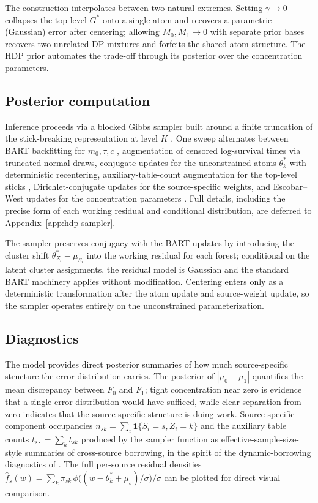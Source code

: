 \documentclass[11pt]{article}
\theoremstyle{plain}
\theoremstyle{definition}
\theoremstyle{remark}
\newcommand{\1}{\mathds{1}}
\begin{document}
The construction interpolates between two natural extremes. Setting $\gamma \to 0$ collapses the top-level $G^*$ onto a single atom and recovers a parametric (Gaussian) error after centering; allowing $M_0, M_1 \to 0$ with separate prior bases recovers two unrelated DP mixtures and forfeits the shared-atom structure. The HDP prior automates the trade-off through its posterior over the concentration parameters.

\subsection{Posterior computation}
\label{sec:hdp-computation}

Inference proceeds via a blocked Gibbs sampler built around a finite truncation of the stick-breaking representation at level $K$ \citep{ishwaran2001gibbs}. One sweep alternates between BART backfitting for $m_0, \tau, c$ \citep{chipman2010bart}, augmentation of censored log-survival times via truncated normal draws, conjugate updates for the unconstrained atoms $\theta_k^*$ with deterministic recentering, auxiliary-table-count augmentation for the top-level sticks \citep{teh2006hierarchical, antoniak1974mixtures}, Dirichlet-conjugate updates for the source-specific weights, and Escobar--West updates for the concentration parameters \citep{escobar1995bayesian}. Full details, including the precise form of each working residual and conditional distribution, are deferred to Appendix~\ref{app:hdp-sampler}.

The sampler preserves conjugacy with the BART updates by introducing the cluster shift $\theta_{Z_i}^* - \mu_{S_i}$ into the working residual for each forest; conditional on the latent cluster assignments, the residual model is Gaussian and the standard BART machinery applies without modification. Centering enters only as a deterministic transformation after the atom update and source-weight update, so the sampler operates entirely on the unconstrained parameterization.

\subsection{Diagnostics}
\label{sec:hdp-diagnostics}

The model provides direct posterior summaries of how much source-specific structure the error distribution carries. The posterior of $|\mu_0 - \mu_1|$ quantifies the mean discrepancy between $F_0$ and $F_1$; tight concentration near zero is evidence that a single error distribution would have sufficed, while clear separation from zero indicates that the source-specific structure is doing work. Source-specific component occupancies $n_{sk} = \sum_i \mathbf{1}\{S_i = s, Z_i = k\}$ and the auxiliary table counts $t_{s\cdot} = \sum_k t_{sk}$ produced by the sampler function as effective-sample-size-style summaries of cross-source borrowing, in the spirit of the dynamic-borrowing diagnostics of \citet{hupf2021bayesian}. The full per-source residual densities $\hat f_s(w) = \sum_k \pi_{sk}\, \phi\big((w - \theta_k^* + \mu_s)/\sigma\big)/\sigma$ can be plotted for direct visual comparison.
\end{document}
